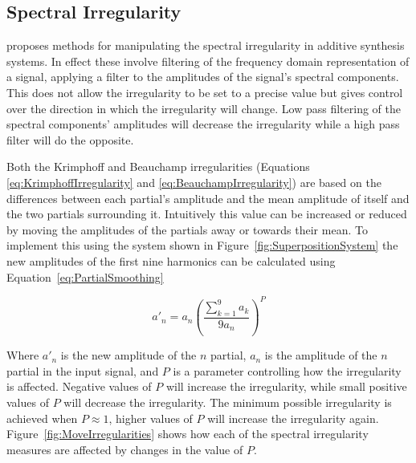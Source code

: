 	\subsection{Spectral Irregularity}
	\label{sec:FeatureControl-Parameterisation-Irregularity}
		\citet{beauchamp2007analysis} proposes methods for manipulating the spectral irregularity in additive
		synthesis systems. In effect these involve filtering of the frequency domain representation of a signal,
		applying a filter to the amplitudes of the signal's spectral components. This does not allow the
		irregularity to be set to a precise value but gives control over the direction in which the irregularity
		will change. Low pass filtering of the spectral components' amplitudes will decrease the irregularity while
		a high pass filter will do the opposite.
		
		Both the Krimphoff and Beauchamp irregularities (Equations \ref{eq:KrimphoffIrregularity} and
		\ref{eq:BeauchampIrregularity}) are based on the differences between each partial's amplitude and the mean
		amplitude of itself and the two partials surrounding it. Intuitively this value can be increased or reduced
		by moving the amplitudes of the partials away or towards their mean. To implement this using the system
		shown in Figure~\ref{fig:SuperpositionSystem} the new amplitudes of the first nine harmonics can be
		calculated using Equation~\ref{eq:PartialSmoothing}

		\begin{equation}
			a'_{n} = a_{n} \left( \frac{\sum_{k = 1}^{9} a_{k}}{9a_{n}} \right) ^{P}
			\label{eq:PartialSmoothing}
		\end{equation}

		Where $a'_{n}$ is the new amplitude of the $n$ partial, $a_{n}$ is the amplitude of the
		$n$ partial in the input signal, and $P$ is a parameter controlling how the irregularity is
		affected. Negative values of $P$ will increase the irregularity, while small positive values of $P$ will
		decrease the irregularity. The minimum possible irregularity is achieved when $P \approx 1$, higher values
		of $P$ will increase the irregularity again. Figure~\ref{fig:MoveIrregularities} shows how each of the
		spectral irregularity measures are affected by changes in the value of $P$.

